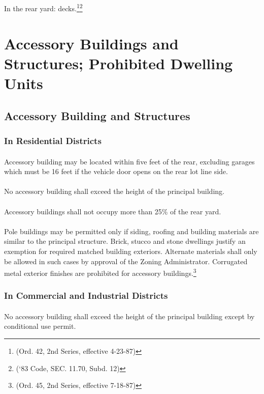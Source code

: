 \subsection{}
In the rear yard:  decks.\footnote{(Ord. 42, 2nd Series, effective 4-23-87)}\footnote{(‘83 Code, SEC. 11.70, Subd. 12)}
\section{Accessory Buildings and Structures; Prohibited Dwelling Units}
\subsection{Accessory Building and Structures}
\subsubsection{In Residential Districts}
\paragraph{}
Accessory building may be located within five feet of the rear, excluding garages which must be 16 feet if the vehicle door opens on the rear lot line side.
\paragraph{}
No accessory building shall exceed the height of the principal building.
\paragraph{}
Accessory buildings shall not occupy more than 25\% of the rear yard.
\paragraph{}
Pole buildings may be permitted only if siding, roofing and building materials are similar to the principal structure. Brick, stucco and stone dwellings justify an exemption for required matched building exteriors. Alternate materials shall only be allowed in such cases by approval of the Zoning Administrator. Corrugated metal exterior finishes are prohibited for accessory buildings.\footnote{(Ord. 45, 2nd Series, effective 7-18-87)}
\subsubsection{In Commercial and Industrial Districts}
\paragraph{}
No accessory building shall exceed the height of the principal building except by conditional use permit.
